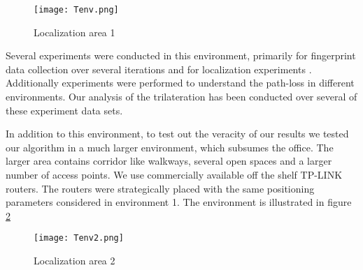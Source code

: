 \documentclass[twocolumn, 11pt]{IEEEtran}
\begin{document}


\begin{figure}[h]
\centering
\texttt{[image: Tenv.png]}
\caption{ Localization area 1 }
\label{fig:tenv}
\end{figure}

Several experiments were conducted in this environment, primarily for fingerprint data collection over several iterations and for localization experiments \cite{shanmugaapriyan2014pragmatic}. Additionally experiments were performed to understand the path-loss in different environments. Our analysis of the trilateration has been conducted over several of these experiment data sets.

In addition to this environment, to test out the veracity of our results we tested our algorithm in a much larger environment, which subsumes the office. The larger area contains corridor like walkways, several open spaces and a larger number of access points. We use commercially available off the shelf TP-LINK routers. The routers were strategically placed with the same positioning parameters considered in environment 1. The environment is illustrated in figure \ref{fig:tenv2}

\begin{figure}[h]
\centering
\texttt{[image: Tenv2.png]}
\caption{ Localization area 2 }
\label{fig:tenv2}
\end{figure}
\end{document}
